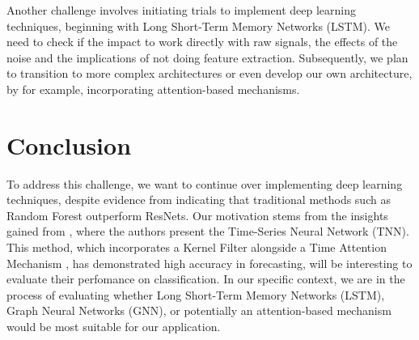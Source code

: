 \documentclass{article}
\begin{document}
Another challenge involves initiating trials to implement deep learning techniques, beginning with Long Short-Term Memory Networks (LSTM). We need to check if the impact to work directly with raw signals, the effects of the noise and the implications of not doing feature extraction. Subsequently, we plan to transition to more complex architectures or even develop our own architecture, by for example, incorporating attention-based mechanisms.

\section{Conclusion}

To address this challenge, we want to continue over implementing deep learning techniques, despite evidence from \cite{Sundararajan2021} indicating that traditional methods such as Random Forest outperform ResNets. Our motivation stems from the insights gained from \cite{Zhang2023}, where the authors present the Time-Series Neural Network (TNN). This method, which incorporates a Kernel Filter alongside a Time Attention Mechanism \cite{Zhang2023}, has demonstrated high accuracy in forecasting, will be interesting to evaluate their perfomance on classification. In our specific context, we are in the process of evaluating whether Long Short-Term Memory Networks (LSTM), Graph Neural Networks (GNN), or potentially an attention-based mechanism would be most suitable for our application.


{
\small
}
\end{document}
